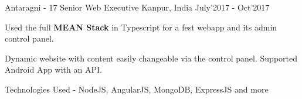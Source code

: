 \begin{cventries}
  \cventry
  {Antaragni - 17}
  {Senior Web Executive}
  {Kanpur, India}
  {July'2017 - Oct'2017}
  {
    \begin{cvitems}
    \item Used the full \textbf{MEAN Stack} in Typescript for a fest webapp and its admin control panel.
    \item Dynamic website with content easily changeable via the control panel. Supported Android App with an API.
    \item Technologies Used - NodeJS, AngularJS, MongoDB, ExpressJS and more
    \end{cvitems}
  }
  


\end{cventries}

